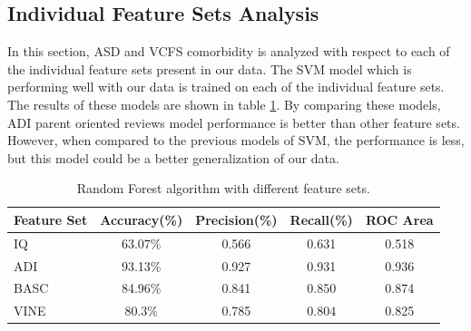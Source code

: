 \subsection{Individual Feature Sets Analysis}
In this section, ASD and VCFS comorbidity is analyzed with respect to each of the individual feature sets present in our data. The SVM model which is performing well with our data is trained on each of the individual feature sets. The results of these models are shown in table \ref{table:58}. By comparing these models, ADI parent oriented reviews model performance is better than other feature sets. However, when compared to the previous models of SVM, the performance is less, but this model could be a better generalization of our data. 
\begin{table}[h]
\begin{center}
\begin{tabular}{|l|c|c|c|c|}
\hline
\textbf{Feature Set}& \textbf{Accuracy(\%)}&	\textbf{Precision(\%)}&	\textbf{Recall(\%)}&	\textbf{ROC Area}\\
\hline \hline
IQ	&63.07\%&	0.566&	0.631&	0.518\\
\hline
ADI& 93.13\%&	0.927&	0.931	&0.936\\
\hline
BASC &84.96\%&	0.841&	0.850&	0.874\\
\hline
VINE&	80.3\%&	0.785&	0.804&	0.825\\
\hline
\end{tabular}
\end{center}
\caption{Random Forest algorithm with different feature sets.}
\label{table:58}
\end{table}

